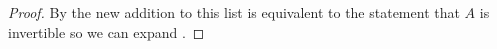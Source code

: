 %
\begin{proof}
By  the new addition to this list is equivalent to the statement that $A$ is invertible so we can expand .
\end{proof}
%
%
